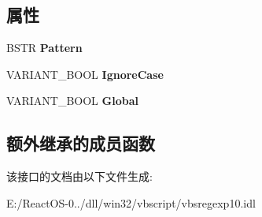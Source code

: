 \subsection*{属性}
\begin{DoxyCompactItemize}
\item 
\mbox{\label{interface_v_b_script___reg_exp__10_1_1_i_reg_exp_a67c11912e162842c7af735ad125a705f}} 
B\+S\+TR {\bfseries Pattern}
\item 
\mbox{\label{interface_v_b_script___reg_exp__10_1_1_i_reg_exp_a72b21b0510c65d2f8f1c009cc238a722}} 
V\+A\+R\+I\+A\+N\+T\+\_\+\+B\+O\+OL {\bfseries Ignore\+Case}
\item 
\mbox{\label{interface_v_b_script___reg_exp__10_1_1_i_reg_exp_a5e9f8da11b606239a474b9e8bd5e3746}} 
V\+A\+R\+I\+A\+N\+T\+\_\+\+B\+O\+OL {\bfseries Global}
\end{DoxyCompactItemize}
\subsection*{额外继承的成员函数}


该接口的文档由以下文件生成\+:\begin{DoxyCompactItemize}
\item 
E\+:/\+React\+O\+S-\/0../dll/win32/vbscript/vbsregexp10.\+idl\end{DoxyCompactItemize}
